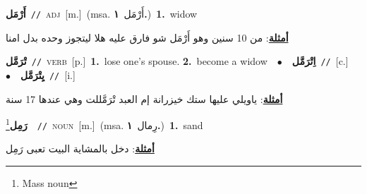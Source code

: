 \documentclass[10pt,a4paper,twoside]{article} %
\begin{document}
\begin{multicols}{2}
{\setlength\topsep{0pt}\textbf{\foreignlanguage{arabic}{أَرْمَل}}\ {\color{gray}\texttt{//}\color{black}}\ \textsc{adj}\ [m.]\ \color{gray}(msa. \foreignlanguage{arabic}{أَرْمَل}~\foreignlanguage{arabic}{\textbf{١.}})\color{black}\ \textbf{1.}~widow\  \begin{flushright}\color{gray}\foreignlanguage{arabic}{\textbf{\underline{\foreignlanguage{arabic}{أمثلة}}}: من 10 سنين وهو أَرْمَل شو فارق عليه هلا ليتجوز وحده بدل امنا}\end{flushright}\color{black}} \vspace{2mm}

{\setlength\topsep{0pt}\textbf{\foreignlanguage{arabic}{تْرَمَّل}}\ {\color{gray}\texttt{//}\color{black}}\ \textsc{verb}\ [p.]\ \textbf{1.}~lose one's spouse.  \textbf{2.}~become a widow\ \ $\bullet$\ \ \setlength\topsep{0pt}\textbf{\foreignlanguage{arabic}{اِتْرَمَّل}}\ {\color{gray}\texttt{//}\color{black}}\ [c.]\ \ $\bullet$\ \ \setlength\topsep{0pt}\textbf{\foreignlanguage{arabic}{يِتْرَمَّل}}\ {\color{gray}\texttt{//}\color{black}}\ [i.]\  \begin{flushright}\color{gray}\foreignlanguage{arabic}{\textbf{\underline{\foreignlanguage{arabic}{أمثلة}}}: ياويلي عليها ستك خيزرانة إم العبد تْرَمَّللت وهي عندها 17 سنة}\end{flushright}\color{black}} \vspace{2mm}

{\setlength\topsep{0pt}\textbf{\foreignlanguage{arabic}{رَمِل}}\footnote{Mass noun}\ \ {\color{gray}\texttt{//}\color{black}}\ \textsc{noun}\ [m.]\ \color{gray}(msa. \foreignlanguage{arabic}{رِمال}~\foreignlanguage{arabic}{\textbf{١.}})\color{black}\ \textbf{1.}~sand\  \begin{flushright}\color{gray}\foreignlanguage{arabic}{\textbf{\underline{\foreignlanguage{arabic}{أمثلة}}}: دخل بالمشاية البيت تعبى رَمِل}\end{flushright}\color{black}} \vspace{2mm}


\end{multicols}
\end{document}
